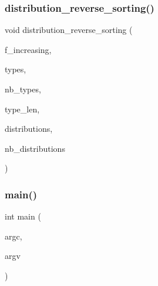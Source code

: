 \subsubsection{\texorpdfstring{distribution\+\_\+reverse\+\_\+sorting()}{distribution\_reverse\_sorting()}}
{\footnotesize\ttfamily void distribution\+\_\+reverse\+\_\+sorting (\begin{DoxyParamCaption}\item[{\mbox{\hyperlink{galois_8h_a09fddde158a3a20bd2dcadb609de11dc}{I\+NT}}}]{f\+\_\+increasing,  }\item[{\mbox{\hyperlink{galois_8h_a09fddde158a3a20bd2dcadb609de11dc}{I\+NT}} $\ast$}]{types,  }\item[{\mbox{\hyperlink{galois_8h_a09fddde158a3a20bd2dcadb609de11dc}{I\+NT}}}]{nb\+\_\+types,  }\item[{\mbox{\hyperlink{galois_8h_a09fddde158a3a20bd2dcadb609de11dc}{I\+NT}}}]{type\+\_\+len,  }\item[{\mbox{\hyperlink{galois_8h_a09fddde158a3a20bd2dcadb609de11dc}{I\+NT}} $\ast$}]{distributions,  }\item[{\mbox{\hyperlink{galois_8h_a09fddde158a3a20bd2dcadb609de11dc}{I\+NT}}}]{nb\+\_\+distributions }\end{DoxyParamCaption})}

\mbox{\label{tdo__refine_8_c_a3c04138a5bfe5d72780bb7e82a18e627}} 
\subsubsection{\texorpdfstring{main()}{main()}}
{\footnotesize\ttfamily int main (\begin{DoxyParamCaption}\item[{int}]{argc,  }\item[{char $\ast$$\ast$}]{argv }\end{DoxyParamCaption})}

\mbox{\label{tdo__refine_8_c_a3d4fe27380b7b1e19b559b17f0de36c1}} 
